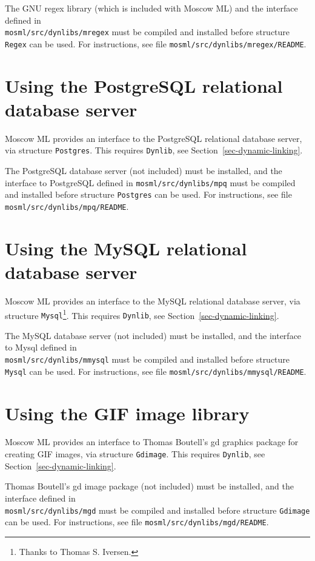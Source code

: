 \documentclass[fleqn]{article}
\begin{document}
The GNU regex library (which is included with Moscow ML) and the
interface defined in\\ {\tt mosml/src/dynlibs/mregex} must be compiled
and installed before
structure {\tt Regex}  can be used.  For instructions, see file
{\tt mosml/src/dynlibs/mregex/README}.


\section{Using the PostgreSQL relational database server}
\label{sec-using-mpq}

Moscow ML provides an interface to the PostgreSQL relational database
server, via structure {\tt Postgres}\@.  This requires {\tt Dynlib},
see Section~\ref{sec-dynamic-linking}.

The PostgreSQL database server (not included) must be installed, and
the interface to PostgreSQL defined in {\tt mosml/src/dynlibs/mpq}
must be compiled and installed before structure {\tt Postgres} can be
used.  For instructions, see file {\tt mosml/src/dynlibs/mpq/README}.


\section{Using the MySQL relational database server}
\label{sec-using-mmysql}

Moscow ML provides an interface to the MySQL relational database
server, via structure {\tt Mysql}\footnote{Thanks to Thomas S.
  Iversen.}\@.  This requires {\tt Dynlib}, see
Section~\ref{sec-dynamic-linking}.

The MySQL database server (not included) must be installed, and the
interface to Mysql defined in\\ {\tt mosml/src/dynlibs/mmysql} must be
compiled and installed before structure {\tt Mysql} can be used.  For
instructions, see file {\tt mosml/src/dynlibs/mmysql/README}.


\section{Using the GIF image library}
\label{sec-using-mgd}

Moscow ML provides an interface to Thomas Boutell's gd graphics
package for creating GIF images, via structure {\tt Gdimage}\@.  This
requires {\tt Dynlib}, see Section~\ref{sec-dynamic-linking}.

Thomas Boutell's gd image package (not included) must be installed,
and the interface defined in\\ {\tt mosml/src/dynlibs/mgd} must be
compiled and installed before structure {\tt Gdimage} can be used.
For instructions, see file {\tt mosml/src/dynlibs/mgd/README}.
\end{document}
